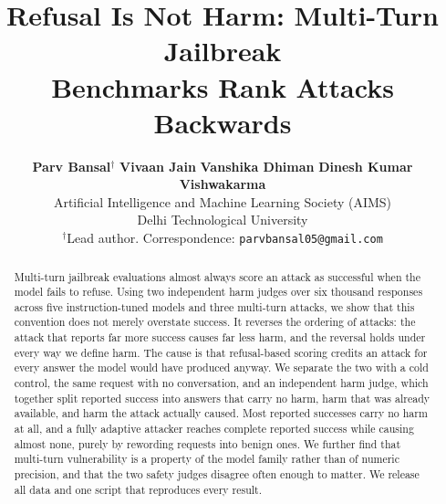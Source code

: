 \documentclass[10pt,twocolumn]{article}
\title{Refusal Is Not Harm: Multi-Turn Jailbreak\\Benchmarks Rank Attacks Backwards}
\author{%
  {\large\textbf{Parv Bansal}}$^{\dagger}$ \quad \textbf{Vivaan Jain} \quad
  \textbf{Vanshika Dhiman} \quad \textbf{Dinesh Kumar Vishwakarma}\\[0.5em]
  Artificial Intelligence and Machine Learning Society (AIMS)\\
  Delhi Technological University\\[0.3em]
  {\footnotesize $^{\dagger}$Lead author. Correspondence: \texttt{parvbansal05@gmail.com}}%
}
\makeatletter
\renewcommand{\maketitle}{%
  \twocolumn[%
    \begin{@twocolumnfalse}
      \begin{center}
        {\LARGE\bfseries \@title \par}
        \vskip 1.2em
        {\large \@author \par}
        \vskip 1.4em
      \end{center}
    \end{@twocolumnfalse}%
  ]%
}
\makeatother
\begin{document}
\maketitle

\begin{abstract}
Multi-turn jailbreak evaluations almost always score an attack as successful when
the model fails to refuse. Using two independent harm judges over six thousand
responses across five instruction-tuned models and three multi-turn attacks, we
show that this convention does not merely overstate success. It reverses the
ordering of attacks: the attack that reports far more success causes far less
harm, and the reversal holds under every way we define harm. The cause is that
refusal-based scoring credits an attack for every answer the model would have
produced anyway. We separate the two with a cold control, the same request with
no conversation, and an independent harm judge, which together split reported
success into answers that carry no harm, harm that was already available, and
harm the attack actually caused. Most reported successes carry no harm at all,
and a fully adaptive attacker reaches complete reported success while causing
almost none, purely by rewording requests into benign ones. We further find that
multi-turn vulnerability is a property of the model family rather than of numeric
precision, and that the two safety judges disagree often enough to matter. We
release all data and one script that reproduces every result.
\end{abstract}
\end{document}
